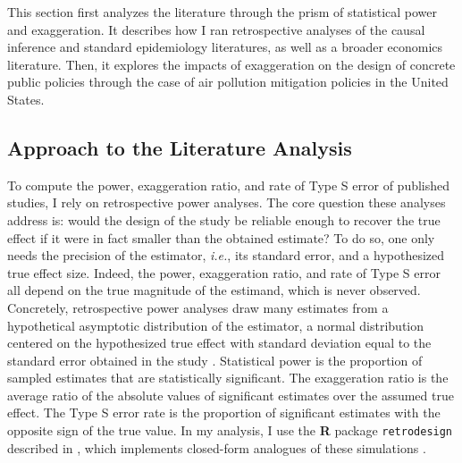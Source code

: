 \documentclass[12pt]{article}
\begin{document}
	This section first analyzes the literature through the prism of statistical power and exaggeration. It describes how I ran retrospective analyses of the causal inference and standard epidemiology literatures, as well as a broader economics literature. Then, it explores the impacts of exaggeration on the design of concrete public policies through the case of air pollution mitigation policies in the United States.
	    
	\subsection{Approach to the Literature Analysis}
    
		To compute the power, exaggeration ratio, and rate of Type S error of published studies, I rely on retrospective power analyses. The core question these analyses address is: would the design of the study be reliable enough to recover the true effect if it were in fact smaller than the obtained estimate? To do so, one only needs the precision of the estimator, \textit{i.e.}, its standard error, and a hypothesized true effect size. Indeed, the power, exaggeration ratio, and rate of Type S error all depend on the true magnitude of the estimand, which is never observed. Concretely, retrospective power analyses draw many estimates from a hypothetical asymptotic distribution of the estimator, a normal distribution centered on the hypothesized true effect with standard deviation equal to the standard error obtained in the study \citep{gelman_beyond_2014}. Statistical power is the proportion of sampled estimates that are statistically significant. The exaggeration ratio is the average ratio of the absolute values of significant estimates over the assumed true effect. The Type S error rate is the proportion of significant estimates with the opposite sign of the true value. In my analysis, I use the \textbf{\textsf{R}} package \texttt{retrodesign} described in \cite{timm_retrodesign_2019}, which implements closed-form analogues of these simulations \citep{lu_note_2019}. 
		
\end{document}
